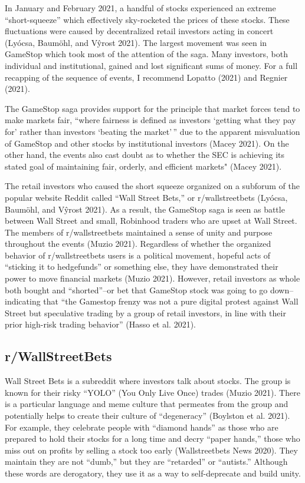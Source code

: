 \documentclass[12pt,]{article}
\begin{document}
In January and February 2021, a handful of stocks experienced an extreme
``short-squeeze'' which effectively sky-rocketed the prices of these
stocks. These fluctuations were caused by decentralized retail investors
acting in concert (Lyócsa, Baumöhl, and Vŷrost 2021). The largest
movement was seen in GameStop which took most of the attention of the
saga. Many investors, both individual and institutional, gained and lost
significant sums of money. For a full recapping of the sequence of
events, I recommend Lopatto (2021) and Regnier (2021).

The GameStop saga provides support for the principle that market forces
tend to make markets fair, ``where fairness is defined as investors
`getting what they pay for' rather than investors `beating the
market'\,'' due to the apparent misvaluation of GameStop and other
stocks by institutional investors (Macey 2021). On the other hand, the
events also cast doubt as to whether the SEC is achieving its stated
goal of maintaining fair, orderly, and efficient markets" (Macey 2021).

The retail investors who caused the short squeeze organized on a
subforum of the popular website Reddit called ``Wall Street Bets,'' or
r/wallstreetbets (Lyócsa, Baumöhl, and Vŷrost 2021). As a result, the
GameStop saga is seen as battle between Wall Street and small, Robinhood
traders who are upset at Wall Street. The members of r/wallstreetbets
maintained a sense of unity and purpose throughout the events (Muzio
2021). Regardless of whether the organized behavior of r/wallstreetbets
users is a political movement, hopeful acts of ``sticking it to
hedgefunds'' or something else, they have demonstrated their power to
move financial markets (Muzio 2021). However, retail investors as whole
both bought and ``shorted''--or bet that GameStop stock was going to go
down--indicating that ``the Gamestop frenzy was not a pure digital
protest against Wall Street but speculative trading by a group of retail
investors, in line with their prior high-risk trading behavior'' (Hasso
et al. 2021).

\hypertarget{rwallstreetbets}{%
\subsection{r/WallStreetBets}\label{rwallstreetbets}}

Wall Street Bets is a subreddit where investors talk about stocks. The
group is known for their risky ``YOLO'' (You Only Live Once) trades
(Muzio 2021). There is a particular language and meme culture that
permeates from the group and potentially helps to create their culture
of ``degeneracy'' (Boylston et al. 2021). For example, they celebrate
people with ``diamond hands'' as those who are prepared to hold their
stocks for a long time and decry ``paper hands,'' those who miss out on
profits by selling a stock too early (Wallstreetbets News 2020). They
maintain they are not ``dumb,'' but they are ``retarded'' or
``autists.'' Although these words are derogatory, they use it as a way
to self-deprecate and build unity.
\end{document}
